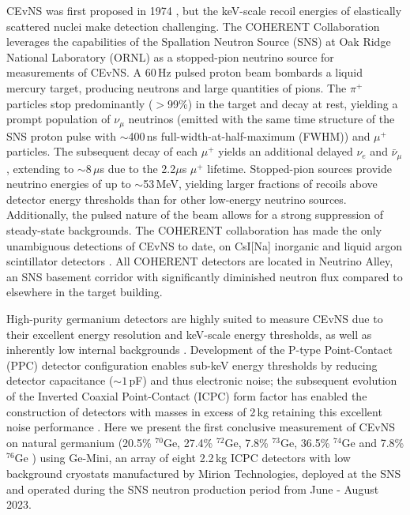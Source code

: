 \documentclass[aps,prltightenlines,superscriptaddress,nofootinbib,amsmath,amssymb,reprint]{revtex4-2}
\begin{document}
CEvNS was first proposed in 1974 \cite{Freedman:1973yd,kopeliovich1974isotopic}, but the keV-scale recoil energies of elastically scattered nuclei make detection challenging. The COHERENT Collaboration %
leverages the capabilities of the Spallation Neutron Source (SNS) at Oak Ridge National Laboratory (ORNL) as a stopped-pion neutrino source for measurements of CEvNS.
A 60\,Hz pulsed proton beam bombards a liquid mercury target, producing neutrons and large quantities of pions. 
The $\pi^+$ particles stop predominantly ($>$99\%) in the target and decay at rest, yielding a prompt population of $\nu_{\mu}$ neutrinos (emitted with the same time structure of the SNS proton pulse with $\sim$400\,ns full-width-at-half-maximum (FWHM)) and $\mu^+$ particles. The subsequent decay of each $\mu^+$ yields an additional delayed $\nu_e$ and $\bar{\nu}_{\mu}$, extending to $\sim8\,\mu$s due to the 2.2$\mu$s $\mu^+$ lifetime.
Stopped-pion sources provide neutrino energies of up to $\sim$53\,MeV, yielding larger fractions of recoils above detector energy thresholds than for other low-energy neutrino sources.
Additionally, the pulsed nature of the beam allows for a strong suppression of steady-state backgrounds.
The COHERENT collaboration has made the only unambiguous detections of CEvNS to date, on CsI[Na] inorganic and liquid argon scintillator detectors \cite{akimov2017observation,akimov2021first,akimov2022measurement}. All COHERENT detectors are located in Neutrino Alley, an SNS basement corridor with significantly diminished neutron flux compared to elsewhere in the target building.
 


High-purity germanium detectors are highly suited to measure CEvNS due to their excellent energy resolution and keV-scale energy thresholds, as well as inherently low internal backgrounds \cite{luke1989low,barbeau2007large,TEXONO:2014eky,CoGeNT:2012sne,bonet2023full}. Development of the P-type Point-Contact (PPC) detector configuration enables sub-keV energy thresholds by reducing detector capacitance ($\sim1$\,pF) and thus electronic noise; the subsequent evolution of the Inverted Coaxial Point-Contact (ICPC) form factor has enabled the construction of detectors with masses in excess of 2\,kg retaining this excellent noise performance \cite{cooper2011novel,jany2021fabrication}.
Here we present the first conclusive measurement of CEvNS on natural germanium (20.5\% $^{70}$Ge, 27.4\% $^{72}$Ge, 7.8\% $^{73}$Ge, 36.5\% $^{74}$Ge and 7.8\% $^{76}$Ge \cite{Geabundance}) using Ge-Mini, an array of eight 2.2\,kg ICPC detectors with low background cryostats manufactured by Mirion Technologies, deployed at the SNS and operated during the SNS neutron production period 
from June - August 2023.  
\end{document}
